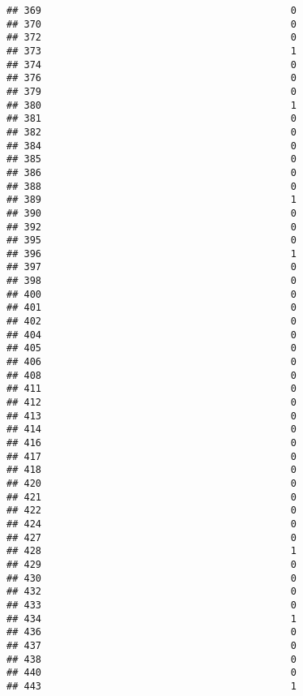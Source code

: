 \documentclass[
]{article}
\begin{document}
\begin{verbatim}
## 369                                           0
## 370                                           0
## 372                                           0
## 373                                           1
## 374                                           0
## 376                                           0
## 379                                           0
## 380                                           1
## 381                                           0
## 382                                           0
## 384                                           0
## 385                                           0
## 386                                           0
## 388                                           0
## 389                                           1
## 390                                           0
## 392                                           0
## 395                                           0
## 396                                           1
## 397                                           0
## 398                                           0
## 400                                           0
## 401                                           0
## 402                                           0
## 404                                           0
## 405                                           0
## 406                                           0
## 408                                           0
## 411                                           0
## 412                                           0
## 413                                           0
## 414                                           0
## 416                                           0
## 417                                           0
## 418                                           0
## 420                                           0
## 421                                           0
## 422                                           0
## 424                                           0
## 427                                           0
## 428                                           1
## 429                                           0
## 430                                           0
## 432                                           0
## 433                                           0
## 434                                           1
## 436                                           0
## 437                                           0
## 438                                           0
## 440                                           0
## 443                                           1

\end{verbatim}
\end{document}
